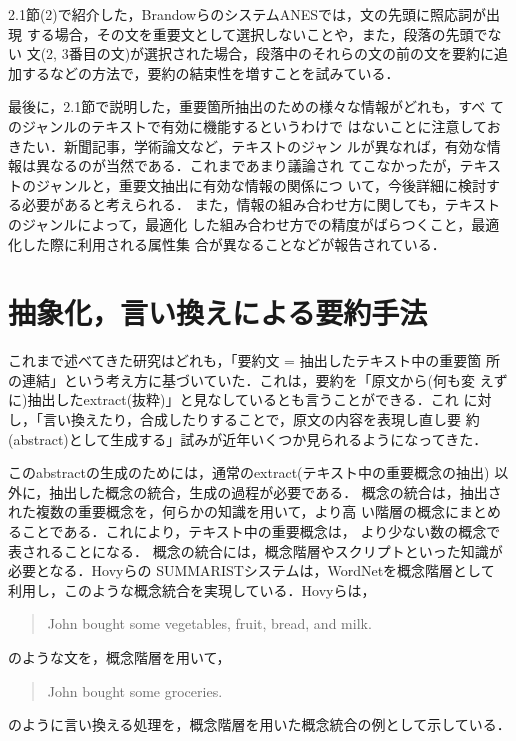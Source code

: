 2.1節(2)で紹介した，BrandowらのシステムANESでは，文の先頭に照応詞が出現
する場合，その文を重要文として選択しないことや，また，段落の先頭でない
文(2, 3番目の文)が選択された場合，段落中のそれらの文の前の文を要約に追
加するなどの方法で，要約の結束性を増すことを試みている．

最後に，2.1節で説明した，重要箇所抽出のための様々な情報がどれも，すべ
てのジャンルのテキストで有効に機能するというわけで
はないことに注意しておきたい．新聞記事，学術論文など，テキストのジャン
ルが異なれば，有効な情報は異なるのが当然である．これまであまり議論され
てこなかったが，テキストのジャンルと，重要文抽出に有効な情報の関係につ
いて，今後詳細に検討する必要があると考えられる．
また，情報の組み合わせ方に関しても，テキストのジャンルによって，最適化
した組み合わせ方での精度がばらつくこと，最適化した際に利用される属性集
合が異なることなどが報告されている\cite{nomoto:97:a,aone:98:b}．

\section{抽象化，言い換えによる要約手法}

これまで述べてきた研究はどれも，「要約文 = 抽出したテキスト中の重要箇
所の連結」という考え方に基づいていた．これは，要約を「原文から(何も変
えずに)抽出したextract(抜粋)」と見なしているとも言うことができる．これ
に対し，「言い換えたり，合成したりすることで，原文の内容を表現し直し要
約(abstract)として生成する」試みが近年いくつか見られるようになってきた．

このabstractの生成のためには，通常のextract(テキスト中の重要概念の抽出)
以外に，抽出した概念の統合，生成の過程が必要である．
概念の統合は，抽出された複数の重要概念を，何らかの知識を用いて，より高 
い階層の概念にまとめることである．これにより，テキスト中の重要概念は，
より少ない数の概念で表されることになる．
概念の統合には，概念階層やスクリプトといった知識が必要となる．Hovyらの
SUMMARIST\cite{hovy:97:a}システムは，WordNetを概念階層として
利用し，このような概念統合を実現している．Hovyらは，
\begin{quote}
John bought some vegetables, fruit, bread, and milk.
\end{quote}
のような文を，概念階層を用いて，
\begin{quote}
John bought some groceries.
\end{quote}
のように言い換える処理を，概念階層を用いた概念統合の例として示している．

